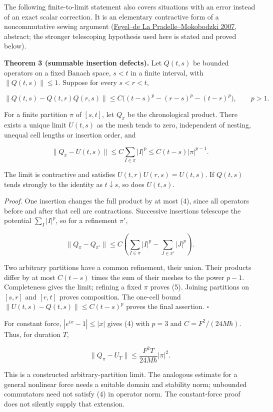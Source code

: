 \documentclass[11pt,a4paper]{article}
\begin{document}
The following finite-to-limit statement also covers situations with an
error instead of an exact scalar correction. It is an elementary
contractive form of a noncommutative sewing argument
(\href{https://arxiv.org/abs/0706.0202}{Feyel--de La
Pradelle--Mokobodzki 2007}, abstract; the stronger telescoping
hypothesis used here is stated and proved below).

\textbf{Theorem 3 (summable insertion defects).} Let \(Q(t,s)\) be
bounded operators on a fixed Banach space, \(s<t\) in a finite interval,
with \(\|Q(t,s)\|\le1\). Suppose for every \(s<r<t\),

\[\|Q(t,s)-Q(t,r)Q(r,s)\|
\le C\bigl((t-s)^p-(r-s)^p-(t-r)^p\bigr),\qquad p>1. \tag{4}\]

For a finite partition \(\pi\) of \([s,t]\), let \(Q_\pi\) be the
chronological product. There exists a unique limit \(U(t,s)\) as the
mesh tends to zero, independent of nesting, unequal cell lengths or
insertion order, and

\[\|Q_\pi-U(t,s)\|\le C\sum_{I\in\pi}|I|^p
\le C(t-s)|\pi|^{p-1}. \tag{5}\]

The limit is contractive and satisfies \(U(t,r)U(r,s)=U(t,s)\). If
\(Q(t,s)\) tends strongly to the identity as \(t\downarrow s\), so does
\(U(t,s)\).

\emph{Proof.} One insertion changes the full product by at most (4),
since all operators before and after that cell are contractions.
Successive insertions telescope the potential \(\sum_I|I|^p\), so for a
refinement \(\pi'\),

\[\|Q_\pi-Q_{\pi'}\|
\le C\left(\sum_{I\in\pi}|I|^p-
\sum_{J\in\pi'}|J|^p\right).\]

Two arbitrary partitions have a common refinement, their union. Their
products differ by at most \(C(t-s)\) times the sum of their meshes to
the power \(p-1\). Completeness gives the limit; refining a fixed
\(\pi\) proves (5). Joining partitions on \([s,r]\) and \([r,t]\) proves
composition. The one-cell bound \(\|U(t,s)-Q(t,s)\|\le C(t-s)^p\) proves
the final assertion. \(\square\)

For constant force, \(|e^{ix}-1|\le|x|\) gives (4) with \(p=3\) and
\(C=F^2/(24M\hbar)\). Thus, for duration \(T\),

\[\|Q_\pi-U_T\|
\le\frac{F^2T}{24M\hbar}|\pi|^2. \tag{6}\]

This is a constructed arbitrary-partition limit. The analogous estimate
for a general nonlinear force needs a suitable domain and stability
norm; unbounded commutators need not satisfy (4) in operator norm. The
constant-force proof does not silently supply that extension.
\end{document}
